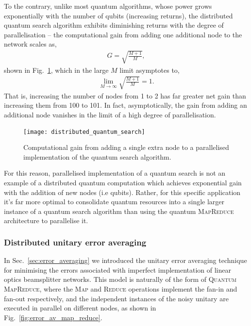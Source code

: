 To the contrary, unlike most quantum algorithms, whose power grows exponentially with the number of qubits (increasing returns), the distributed quantum search algorithm exhibits diminishing returns with the degree of parallelisation -- the computational gain from adding one additional node to the network scales as,
\begin{align}
G=\sqrt{\frac{M+1}{M}},
\end{align}
shown in Fig.~\ref{fig:dist_quant_search}, which in the large $M$ limit asymptotes to,
\begin{align}
\lim_{M\to\infty} \sqrt{\frac{M+1}{M}} = 1.
\end{align}
That is, increasing the number of nodes from 1 to 2 has far greater net gain than increasing them from 100 to 101. In fact, asymptotically, the gain from adding an additional node vanishes in the limit of a high degree of parallelisation.

\begin{figure}[!htpb]
	\texttt{[image: distributed\_quantum\_search]}
	\captionspacefig \caption{Computational gain from adding a single extra node to a parallelised implementation of the quantum search algorithm.}\label{fig:dist_quant_search}
\end{figure}

For this reason, parallelised implementation of a quantum search is not an example of a distributed quantum computation which achieves exponential gain with the addition of new nodes (i.e qubits). Rather, for this specific application it's far more optimal to consolidate quantum resources into a single larger instance of a quantum search algorithm than using the quantum \textsc{MapReduce} architecture to parallelise it.


\subsubsection{Distributed unitary error averaging}\label{sec:error_av_parallel}

In Sec.~\ref{sec:error_averaging} we introduced the unitary error averaging technique for minimising the errors associated with imperfect implementation of linear optics beamsplitter networks. This model is naturally of the form of \textsc{Quantum MapReduce}, where the \textsc{Map} and \textsc{Reduce} operations implement the fan-in and fan-out respectively, and the independent instances of the noisy unitary are executed in parallel on different nodes, as shown in Fig.~\ref{fig:error_av_map_reduce}.


